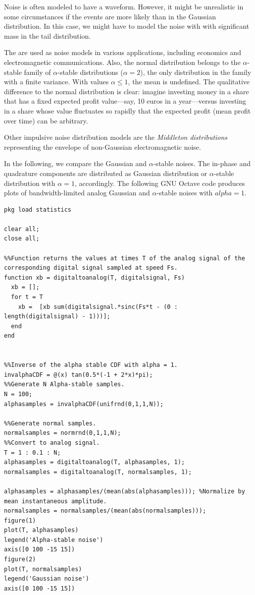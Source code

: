 \documentclass{article}
\begin{document}
Noise is often modeled to have a  waveform. However, it might be unrealistic in some circumstances if the  events are more likely than in the Gaussian distribution. In this case, we might have to model the noise with  with significant mass in the tail distribution. 

The  are used as noise models in various applications, including economics and electromagnetic communications. Also, the normal distribution belongs to the $\alpha$-stable family of $\alpha$-stable distributions ($\alpha = 2$), the only distribution in the family with a finite variance. With values $\alpha \leq 1$, the mean is undefined. The qualitative difference to the normal distribution is clear: imagine investing money in a share that has a fixed expected profit value---say, 10 euros in a year---versus investing in a share whose value fluctuates so rapidly that the expected profit (mean profit over time) can be arbitrary.

Other impulsive noise distribution models are the \textit{Middleton distributions} representing the envelope of non-Gaussian electromagnetic noise.

In the following, we compare the Gaussian and $\alpha$-stable noises. The in-phase and quadrature components are distributed as Gaussian distribution or $\alpha$-stable distribution with $\alpha =1$, accordingly. The following GNU Octave code produces plots of bandwidth-limited analog Gaussian and  $\alpha$-stable noises with $alpha = 1$. 

\begin{verbatim}
pkg load statistics

clear all;
close all;

%%Function returns the values at times T of the analog signal of the corresponding digital signal sampled at speed Fs.
function xb = digitaltoanalog(T, digitalsignal, Fs)
  xb = [];
  for t = T
    xb =  [xb sum(digitalsignal.*sinc(Fs*t - (0 : length(digitalsignal) - 1)))];
  end
end


%%Inverse of the alpha stable CDF with alpha = 1.
invalphaCDF = @(x) tan(0.5*(-1 + 2*x)*pi);
%%Generate N Alpha-stable samples.
N = 100;
alphasamples = invalphaCDF(unifrnd(0,1,1,N));

%%Generate normal samples.
normalsamples = normrnd(0,1,1,N);
%%Convert to analog signal.
T = 1 : 0.1 : N;
alphasamples = digitaltoanalog(T, alphasamples, 1);
normalsamples = digitaltoanalog(T, normalsamples, 1);

alphasamples = alphasamples/(mean(abs(alphasamples))); %Normalize by mean instantaneous amplitude.
normalsamples = normalsamples/(mean(abs(normalsamples)));
figure(1)
plot(T, alphasamples)
legend('Alpha-stable noise')
axis([0 100 -15 15])
figure(2)
plot(T, normalsamples)
legend('Gaussian noise')
axis([0 100 -15 15])


\end{verbatim}
\end{document}
